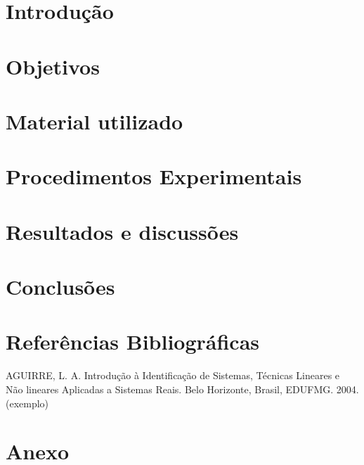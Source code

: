 \documentclass[a4paper, 12pt]{article}
\begin{document}
\newpage
{}
\section{Introdução}
\newpage
\section{Objetivos}
\newpage

\section{Material utilizado}

\newpage
\section{Procedimentos Experimentais}
\newpage
\section{Resultados e discussões}
\newpage

\section{Conclusões}
\newpage

\section*{Referências Bibliográficas}
\footnotesize{

\noindent AGUIRRE, L. A. Introdução à Identificação de Sistemas, Técnicas Lineares e Não lineares Aplicadas a Sistemas Reais. Belo Horizonte, Brasil, EDUFMG. 2004.(exemplo)\\

}
\newpage
{}
\section*{Anexo}
\end{document}

